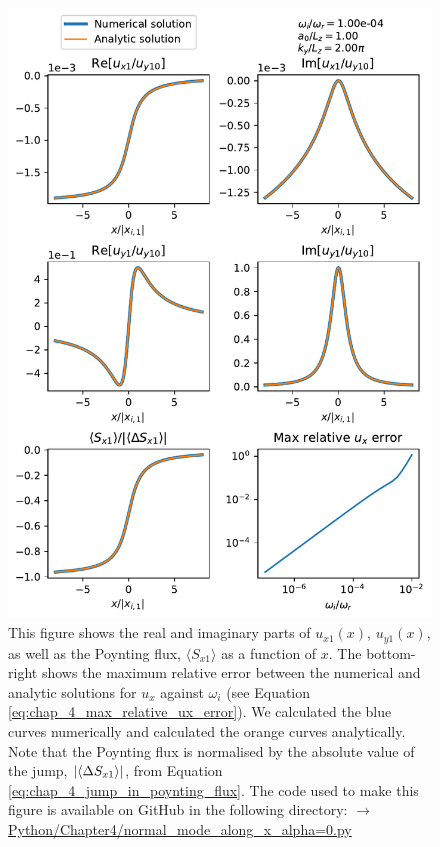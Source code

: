 \begin{figure}
    \centering
    \vspace{-20pt}
    \includegraphics[width=\textwidth,height=0.92\textheight,keepaspectratio]{figures/chapter04/normal_mode_along_x_alpha=0.pdf}
    \vspace{-10pt}
    \caption{This figure shows the real and imaginary parts of $u_{x1}(x)$, $u_{y1}(x)$, as well as the Poynting flux, $\langle S_{x1}\rangle$ as a function of $x$. The bottom-right shows the maximum relative error between the numerical and analytic solutions for $u_x$ against $\omega_i$ (see Equation \ref{eq:chap_4_max_relative_ux_error}). We calculated the blue curves numerically and calculated the orange curves analytically. Note that the Poynting flux is normalised by the absolute value of the jump, $\abs{\langle\Delta S_{x1}\rangle}$, from Equation \eqref{eq:chap_4_jump_in_poynting_flux}. The code used to make this figure is available on GitHub in the following directory:\newline
    \href{https://github.com/aleksyprok/apkp_thesis/blob/main/Python/Chapter4/normal_mode_along_x_alpha\%3D0.py}{$\rightarrow$ Python/Chapter4/normal\_mode\_along\_x\_alpha=0.py}}
    \vspace{-20pt}
    \label{fig:normal_mode_along_x_alpha=0}
\end{figure}

